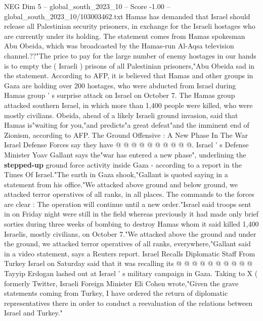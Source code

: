 \begin{textsample}{NEG Dim 5 – global\_south\_2023\_10 – Score -1.00 – global\_south\_2023\_10/103003462.txt}  \label{ex:f5_neg_068}
Hamas has demanded that Israel should release all Palestinian security prisoners, in exchange for the Israeli hostages who are currently under its holding.
The statement comes from Hamas spokesman Abu Obeida, which was broadcasted by the Hamas-run Al-Aqsa television channel.??"The price to pay for the large number of enemy hostages in our hands is to empty the ( Israeli ) prisons of all Palestinian prisoners,"Abu Obeida sad in the statement.
According to AFP, it is believed that Hamas and other groups in Gaza are holding over 200 hostages, who were abducted from Israel during Hamas group ' s surprise attack on Israel on October 7.
The Hamas group attacked southern Israel, in which more than 1,400 people were killed, who were mostly civilians.
Obeida, ahead of a likely Israeli ground invasion, said that Hamas is"waiting for you,"and predicts"a great defeat"and the imminent end of Zionism, according to AFP.
The Ground Offensive : A New Phase In The War Israel Defense Forces say they have @ @ @ @ @ @ @ @ @ @.
Israel ' s Defense Minister Yoav Gallant says the"war has entered a new phase", underlining the \textbf{stepped-up} ground force activity inside Gaza - according to a report in the Times Of Israel."The earth in Gaza shook,"Gallant is quoted saying in a statement from his office."We attacked above ground and below ground, we attacked terror operatives of all ranks, in all places.
The commands to the forces are clear : The operation will continue until a new order."Israel said troops sent in on Friday night were still in the field whereas previously it had made only brief sorties during three weeks of bombing to destroy Hamas whom it said killed 1,400 Israelis, mostly civilians, on October 7."We attacked above the ground and under the ground, we attacked terror operatives of all ranks, everywhere,"Gallant said in a video statement, says a Reuters report.
Israel Recalls Diplomatic Staff From Turkey Israel on Saturday said that it was recalling its @ @ @ @ @ @ @ @ @ @ Tayyip Erdogan lashed out at Israel ' s military campaign in Gaza.
Taking to X ( formerly Twitter, Israeli Foreign Minister Eli Cohen wrote,"Given the grave statements coming from Turkey, I have ordered the return of diplomatic representatives there in order to conduct a reevaluation of the relations between Israel and Turkey."

\end{textsample}
